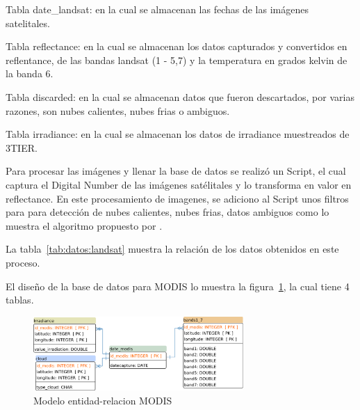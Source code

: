 Tabla date\_landsat: en la cual se almacenan las fechas de las imágenes satelitales.

Tabla reflectance: en la cual se almacenan los datos capturados y convertidos en reflentance,
de las bandas landsat (1 - 5,7) y la temperatura en grados kelvin de la banda 6.

Tabla discarded: en la cual se almacenan datos que fueron descartados, por varias razones,
son nubes calientes, nubes frias o ambiguos.

Tabla irradiance: en la cual se almacenan los datos de irradiance muestreados de 3TIER.

Para procesar las imágenes y llenar la base de datos se realizó un Script, el cual captura el Digital Number
de las imágenes satélitales y lo transforma en valor en reflectance. En este procesamiento de imagenes, se adiciono al Script unos filtros para para detección de nubes calientes,
nubes frias, datos ambiguos como lo muestra el algoritmo propuesto por \cite{irish2000landsat}. 

La tabla~\ref{tab:datos:landsat} muestra la relación de los datos obtenidos en este proceso.

\begin{table}
\caption{Datos obtenidos en en el proceso de procesamiento y limpieza  de datos Landsat 7}
\label{tab:datos:landsat}
\centering
{}
\end{table}

El diseño de la base de datos para MODIS lo muestra la figura~\ref{fig:modisET}, la cual tiene 4 tablas.

\begin{figure}
  \centering
  \includegraphics[width = 8cm]{bdmodis.pdf}
  \caption{Modelo entidad-relacion MODIS}
  \label{fig:modisET}
\end{figure}

